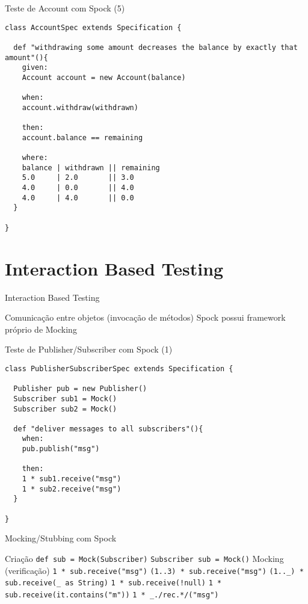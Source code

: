 \documentclass{beamer}
\begin{document}
\begin{frame}[fragile]{Teste de Account com Spock (5)}
 \begin{verbatim}
class AccountSpec extends Specification {
  
  def "withdrawing some amount decreases the balance by exactly that amount"(){
    given:
    Account account = new Account(balance)
    
    when:
    account.withdraw(withdrawn)
    
    then:
    account.balance == remaining
    
    where:
    balance | withdrawn || remaining
    5.0     | 2.0       || 3.0
    4.0     | 0.0       || 4.0
    4.0     | 4.0       || 0.0
  }
  
}
  \end{verbatim}
\end{frame}

\section{Interaction Based Testing}

\begin{frame}{Interaction Based Testing}
 \begin{outline}
    Comunicação entre objetos (invocação de métodos)
    Spock possui framework próprio de Mocking
 \end{outline}
\end{frame}

\begin{frame}[fragile]{Teste de Publisher/Subscriber com Spock (1)}
 \begin{verbatim}
class PublisherSubscriberSpec extends Specification {

  Publisher pub = new Publisher()
  Subscriber sub1 = Mock()
  Subscriber sub2 = Mock()
  
  def "deliver messages to all subscribers"(){
    when:
    pub.publish("msg")
    
    then:
    1 * sub1.receive("msg")
    1 * sub2.receive("msg")
  }
  
}
  \end{verbatim}
\end{frame}

\begin{frame}{Mocking/Stubbing com Spock}
 \begin{outline}
    Criação
    \2 \texttt{def sub = Mock(Subscriber)}
    \2 \texttt{Subscriber sub = Mock()}
    Mocking (verificação)
     \texttt{1 * sub.receive("msg")}
     \texttt{(1..3) * sub.receive("msg")}
     \texttt{(1.._) * sub.receive(_ as String)}
     \texttt{1 * sub.receive(!null)}
     \texttt{1 * sub.receive({it.contains("m")})}
     \texttt{1 * _./rec.*/("msg")}
 \end{outline}
\end{frame}
\end{document}
